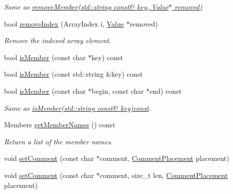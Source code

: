 \begin{DoxyCompactItemize}
\begin{DoxyCompactList}\small\item\em Same as \hyperlink{class_json_1_1_value_a3749dae413a73eac05b7f8dc6deeb6a2}{remove\-Member(std\-::string const\& key, Value$\ast$ removed)} \end{DoxyCompactList}\item 
bool \hyperlink{class_json_1_1_value_ae9e67e08a85a2f3be3396ec0f4c47f65}{remove\-Index} (Array\-Index i, \hyperlink{class_json_1_1_value}{Value} $\ast$removed)
\begin{DoxyCompactList}\small\item\em Remove the indexed array element. \end{DoxyCompactList}\item 
bool \hyperlink{class_json_1_1_value_a196defba501d70ea2b6793afb04108e3}{is\-Member} (const char $\ast$key) const 
\item 
bool \hyperlink{class_json_1_1_value_af728b5738aaa133f3aad2e39dc4f415e}{is\-Member} (const std\-::string \&key) const 
\item 
\hypertarget{class_json_1_1_value_a077604b87a79d75543a1b5438eb9d8ab}{bool \hyperlink{class_json_1_1_value_a077604b87a79d75543a1b5438eb9d8ab}{is\-Member} (const char $\ast$begin, const char $\ast$end) const }\label{class_json_1_1_value_a077604b87a79d75543a1b5438eb9d8ab}

\begin{DoxyCompactList}\small\item\em Same as \hyperlink{class_json_1_1_value_af728b5738aaa133f3aad2e39dc4f415e}{is\-Member(std\-::string const\& key)const}. \end{DoxyCompactList}\item 
Members \hyperlink{class_json_1_1_value_a30fa08af88f2d0a038b22ba9f4e88b2a}{get\-Member\-Names} () const 
\begin{DoxyCompactList}\small\item\em Return a list of the member names. \end{DoxyCompactList}\item 
void \hyperlink{class_json_1_1_value_a29f3a30f7e5d3af6f38d57999bf5b480}{set\-Comment} (const char $\ast$comment, \hyperlink{namespace_json_a4fc417c23905b2ae9e2c47d197a45351}{Comment\-Placement} placement)
\item 
\hypertarget{class_json_1_1_value_a2900152a2887b410a9ddabe278b9d492}{void \hyperlink{class_json_1_1_value_a2900152a2887b410a9ddabe278b9d492}{set\-Comment} (const char $\ast$comment, size\-\_\-t len, \hyperlink{namespace_json_a4fc417c23905b2ae9e2c47d197a45351}{Comment\-Placement} placement)}\label{class_json_1_1_value_a2900152a2887b410a9ddabe278b9d492}


\end{DoxyCompactItemize}
